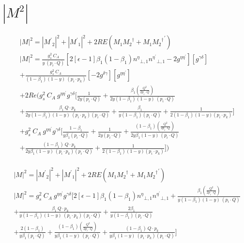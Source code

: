 \section{$|M^{2}|$}

\begin{equation}
\begin{split}
&|M|^{2}=|{M^{\prime}}_2|^{2}+|{M^{\prime}}_1|^{2}+2RE(M_1{M_2}^{\dagger}+{M_1{M_2}^{\dagger}}^{\prime})\\
&{|{M}|}^2 =\frac{g_s^2\: C_A}{y\:(p_i\cdot Q)}[2[\epsilon-1]{\beta_1}(1-\beta_1){n^{{\eta}}}_{\bot,1}{n^{{\eta}^{\prime}}}_{\bot,1}-2g^{{\eta}{{\eta}^{\prime}}}][g^{{\gamma}{{\delta}}}]\\
&+\frac{g_s^2\: C_A}{(1-\beta_1) (1-y)\:(p_i \cdot p_k)}[-2g^{{\delta}{\gamma}}][g^{{\eta}{{\eta}^{\prime}}}]\\
&+2Re(g_s^2\: C_A\:g^{{{\eta}}{{\eta}^{\prime}}}g^{{{\gamma}}{{\delta}}}[\frac{1}{2y(p_i \cdot Q)}+\frac{\beta_1(\frac{Q^2}{2p_i \cdot Q})}{2y(1-\beta_1) (1-y)\:(p_i \cdot Q)}\\
&+\frac{\beta_1\:Q\cdot p_k}{2y(1-\beta_1) (1-y)\:(p_i \cdot p_k)(p_i \cdot Q)}+\frac{\beta_1}{y(1-\beta_1) (p_i \cdot Q)}+\frac{1}{2(1-\beta_1)(1-y) (p_i \cdot p_k)}]\\
&+g_s^2\: C_A\:g^{{{\eta}}{{\eta}^{\prime}}}g^{{{\gamma}}{{\delta}}}[\frac{1-\beta_1}{y\beta_1 (p_i \cdot Q)}+\frac{1}{2y(p_i \cdot Q)}+\frac{(1-\beta_1)(\frac{Q^2}{2p_i \cdot Q})}{2y\beta_1 (1-y)\:(p_i \cdot Q)}\\
&+\frac{(1-\beta_1)\:Q\cdot p_k}{2y\beta_1 (1-y)\:(p_i \cdot p_k)(p_i \cdot Q)}+\frac{1}{2(1-\beta_1)(1-y) (p_i \cdot p_k)}])  \\
\end{split}
\end{equation}


\begin{equation}
\begin{split}
&|M|^{2}=|{M^{\prime}}_2|^{2}+|{M^{\prime}}_1|^{2}+2RE(M_1{M_2}^{\dagger}+{M_1{M_2}^{\dagger}}^{\prime})\\
&{|{M}|}^2 =g_s^2\: C_A\:g^{{{\eta}}{{\eta}^{\prime}}}g^{{{\gamma}}{{\delta}}}[2[\epsilon-1]{\beta_1}(1-\beta_1){n^{{\eta}}}_{\bot,1}{n^{{\eta}^{\prime}}}_{\bot,1}+\frac{\beta_1(\frac{Q^2}{2p_i \cdot Q})}{y(1-\beta_1) (1-y)\:(p_i \cdot Q)}\\
&+\frac{\beta_1\:Q\cdot p_k}{y(1-\beta_1) (1-y)\:(p_i \cdot p_k)(p_i \cdot Q)}+\frac{2\beta_1}{y(1-\beta_1) (p_i \cdot Q)}\\
&+\frac{2(1-\beta_1)}{y\beta_1 (p_i \cdot Q)}+\frac{(1-\beta_1)(\frac{Q^2}{2p_i \cdot Q})}{y\beta_1 (1-y)\:(p_i \cdot Q)}+\frac{(1-\beta_1)\:Q\cdot p_k}{y\beta_1 (1-y)\:(p_i \cdot p_k)(p_i \cdot Q)}]  \\
\end{split}
\end{equation}


